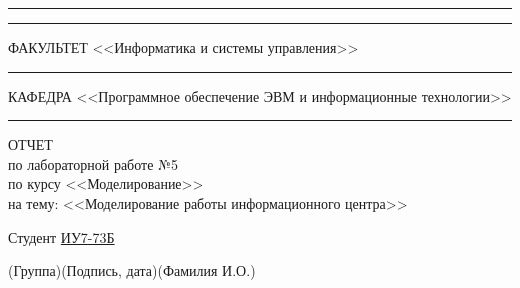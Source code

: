 \begin{titlepage}
	\vspace{-2pt}
	\hspace{-34.5pt}\rule{\textwidth}{2.5pt}
	
	\vspace*{-20.3pt}
	\hspace{-34.5pt}\rule{\textwidth}{0.4pt}
	
	\vspace{0.5ex}
	\noindent \small ФАКУЛЬТЕТ\hspace{80pt} <<Информатика и системы управления>>
	
	\vspace*{-16pt}
	\hspace{35pt}\rule{0.855\textwidth}{0.4pt}
	
	\vspace{0.5ex}
	\noindent \small КАФЕДРА\hspace{50pt} <<Программное обеспечение ЭВМ и информационные технологии>>
	
	\vspace*{-16pt}
	\hspace{25pt}\rule{0.875\textwidth}{0.4pt}
	
	
	\vspace{3em}
	
	\begin{center}
		\Large {ОТЧЕТ}\\
		\normalsize по лабораторной работе №5\\
		по курсу <<Моделирование>>\\
		на тему: <<Моделирование работы информационного центра>>
	\end{center}
	
	\vspace{\fill}
	
	
	\newlength{\ML}
	
	\noindent Студент \underline{\hspace{0.1cm}ИУ7-73Б\hspace{0.1cm}} \hfill \underline{\hspace{4cm}}\quad
	\underline{\hspace{0.4cm}\hspace{0.5cm}}
	
	\vspace{-2.1ex}
	\noindent\hspace{9ex}\scriptsize{(Группа)}\normalsize\hspace{170pt}\hspace{2ex}\scriptsize{(Подпись, дата)}\normalsize\hspace{30pt}\hspace{6ex}\scriptsize{(Фамилия И.О.)}\normalsize
	

\end{titlepage}
